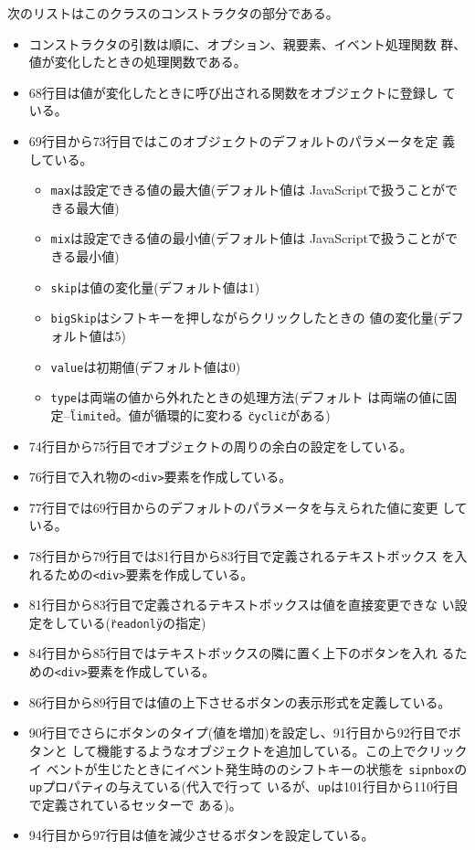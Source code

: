 次のリストはこのクラスのコンストラクタの部分である。
\begin{itemize}
 \item コンストラクタの引数は順に、オプション、親要素、イベント処理関数
       群、値が変化したときの処理関数である。
 \item 68行目は値が変化したときに呼び出される関数をオブジェクトに登録し
       ている。
 \item 69行目から73行目ではこのオブジェクトのデフォルトのパラメータを定
       義している。
       \begin{itemize}
        \item \texttt{max}は設定できる値の最大値(デフォルト値は
              JavaScriptで扱うことができる最大値)
        \item \texttt{mix}は設定できる値の最小値(デフォルト値は
              JavaScriptで扱うことができる最小値)
        \item \texttt{skip}は値の変化量(デフォルト値は$1$)
        \item \texttt{bigSkip}はシフトキーを押しながらクリックしたときの
              値の変化量(デフォルト値は$5$)
        \item \texttt{value}は初期値(デフォルト値は$0$)
        \item \texttt{type}は両端の値から外れたときの処理方法(デフォルト
              は両端の値に固定--\texttt{\"limited\"}。値が循環的に変わる
              \texttt{\"cyclic\"}がある)
       \end{itemize}
 \item 74行目から75行目でオブジェクトの周りの余白の設定をしている。
 \item 76行目で入れ物の\texttt{<div>}要素を作成している。
 \item 77行目では69行目からのデフォルトのパラメータを与えられた値に変更
       している。
 \item 78行目から79行目では81行目から83行目で定義されるテキストボックス
       を入れるための\texttt{<div>}要素を作成している。
 \item 81行目から83行目で定義されるテキストボックスは値を直接変更できな
       い設定をしている(\texttt{\"readonly\"}の指定)
 \item 84行目から85行目ではテキストボックスの隣に置く上下のボタンを入れ
       るための\texttt{<div>}要素を作成している。
 \item 86行目から89行目では値の上下させるボタンの表示形式を定義している。
 \item 90行目でさらにボタンのタイプ(値を増加)を設定し、91行目から92行目でボタンと
       して機能するようなオブジェクトを追加している。この上でクリックイ
       ベントが生じたときにイベント発生時ののシフトキーの状態を
       \texttt{sipnbox}の\texttt{up}プロパティの与えている(代入で行って
       いるが、\texttt{up}は101行目から110行目で定義されているセッターで
       ある)。
 \item 94行目から97行目は値を減少させるボタンを設定している。
\end{itemize}
